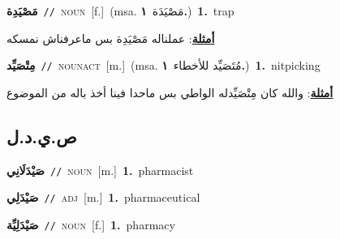 \documentclass[10pt,a4paper,twoside]{article} %
\begin{document}
\begin{multicols}{2}
{\setlength\topsep{0pt}\textbf{\foreignlanguage{arabic}{مَصْيَدِة}}\ {\color{gray}\texttt{//}\color{black}}\ \textsc{noun}\ [f.]\ \color{gray}(msa. \foreignlanguage{arabic}{مَصْيَدَة}~\foreignlanguage{arabic}{\textbf{١.}})\color{black}\ \textbf{1.}~trap\  \begin{flushright}\color{gray}\foreignlanguage{arabic}{\textbf{\underline{\foreignlanguage{arabic}{أمثلة}}}: عملناله مَصْيَدِة بس ماعرفناش نمسكه}\end{flushright}\color{black}} \vspace{2mm}

{\setlength\topsep{0pt}\textbf{\foreignlanguage{arabic}{مِتْصَيِّد}}\ {\color{gray}\texttt{//}\color{black}}\ \textsc{noun\textunderscore act}\ [m.]\ \color{gray}(msa. \foreignlanguage{arabic}{مُتَصَيِّد للأخطاء}~\foreignlanguage{arabic}{\textbf{١.}})\color{black}\ \textbf{1.}~nitpicking\  \begin{flushright}\color{gray}\foreignlanguage{arabic}{\textbf{\underline{\foreignlanguage{arabic}{أمثلة}}}: والله كان مِتْصَيِّدله الواطي بس ماحدا فينا أخذ باله من الموضوع}\end{flushright}\color{black}} \vspace{2mm}

\vspace{-3mm}
\subsection*{\color{blue}\foreignlanguage{arabic}{ص.ي.د.ل}\color{blue}{}} 

{\setlength\topsep{0pt}\textbf{\foreignlanguage{arabic}{صَيْدَلَانِي}}\ {\color{gray}\texttt{//}\color{black}}\ \textsc{noun}\ [m.]\ \textbf{1.}~pharmacist\ } \vspace{2mm}

{\setlength\topsep{0pt}\textbf{\foreignlanguage{arabic}{صَيْدَلِي}}\ {\color{gray}\texttt{//}\color{black}}\ \textsc{adj}\ [m.]\ \textbf{1.}~pharmaceutical\ } \vspace{2mm}

{\setlength\topsep{0pt}\textbf{\foreignlanguage{arabic}{صَيْدَلِيِّة}}\ {\color{gray}\texttt{//}\color{black}}\ \textsc{noun}\ [f.]\ \textbf{1.}~pharmacy\ } \vspace{2mm}


\end{multicols}
\end{document}
